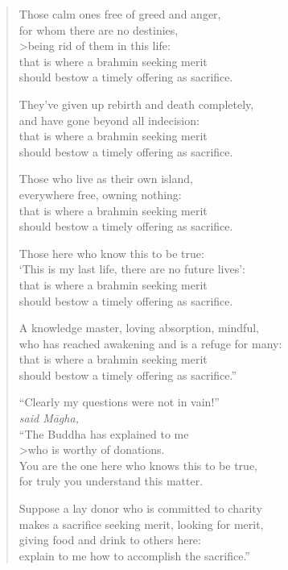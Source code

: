 \documentclass[12pt,openany]{book}%
\newcommand*{\scspeaker}[1]{\hspace{2em}\textit{#1}}
\begin{document}
\begin{verse}
Those calm ones free of greed and anger, \\
for whom there are no destinies, \\>being rid of them in this life: \\
that is where a brahmin seeking merit \\
should bestow a timely offering as sacrifice. 

They’ve given up rebirth and death completely, \\
and have gone beyond all indecision: \\
that is where a brahmin seeking merit \\
should bestow a timely offering as sacrifice. 

Those who live as their own island, \\
everywhere free, owning nothing: \\
that is where a brahmin seeking merit \\
should bestow a timely offering as sacrifice. 

Those here who know this to be true: \\
‘This is my last life, there are no future lives’: \\
that is where a brahmin seeking merit \\
should bestow a timely offering as sacrifice. 

A knowledge master, loving absorption, mindful, \\
who has reached awakening and is a refuge for many: \\
that is where a brahmin seeking merit \\
should bestow a timely offering as sacrifice.” 

“Clearly my questions were not in vain!” \\
\scspeaker{said \textsanskrit{Māgha}, }\\
“The Buddha has explained to me \\>who is worthy of donations. \\
You are the one here who knows this to be true, \\
for truly you understand this matter. 

Suppose a lay donor who is committed to charity \\
makes a sacrifice seeking merit, looking for merit, \\
giving food and drink to others here: \\
explain to me how to accomplish the sacrifice.” 


\end{verse}
\end{document}
